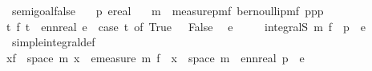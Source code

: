 \begin{isabellebody}
%
\isadelimproof
\isanewline
%
\endisadelimproof
\isanewline
\isanewline
{}\isamarkupfalse%
\ semi{\isacharunderscore}{\kern0pt}goal{}{}{\isacharunderscore}{\kern0pt}false{\isacharcolon}{\kern0pt}\isanewline
\ \ \ p{}\ e{\isacharcolon}{\kern0pt}{\isacharcolon}{\kern0pt}real\isanewline
\ \ \ {\isachardoublequoteopen}m\ {\isacharequal}{\kern0pt}\ measure{\isacharunderscore}{\kern0pt}pmf\ {\isacharparenleft}{\kern0pt}bernoulli{\isacharunderscore}{\kern0pt}pmf\ p{}{\isacharparenright}{\kern0pt}{\isachardoublequoteclose}{\isachardoublequoteopen}{}{\isasymle}p{}{\isachardoublequoteclose}{\isachardoublequoteopen}p{}{\isasymle}{}{\isachardoublequoteclose}\isanewline
{\isachardoublequoteopen}{\isasymAnd}t{\isachardot}{\kern0pt}\ f\ t\ {\isacharequal}{\kern0pt}\ ennreal\ e\ {\isacharasterisk}{\kern0pt}\ {\isacharparenleft}{\kern0pt}case\ t\ of\ True\ {\isasymRightarrow}\ {}{\isacharbar}{\kern0pt}\ False\ {\isasymRightarrow}\ {}{\isacharparenright}{\kern0pt}{\isachardoublequoteclose}\isanewline
{\isachardoublequoteopen}e\ {\isachargreater}{\kern0pt}\ {}{\isachardoublequoteclose}\isanewline
\ \ \ {\isachardoublequoteopen}integral\isactrlsup S\ m\ f\ {\isacharequal}{\kern0pt}\ {\isacharparenleft}{\kern0pt}{}{\isacharminus}{\kern0pt}p{}{\isacharparenright}{\kern0pt}\ {\isacharasterisk}{\kern0pt}\ e{\isachardoublequoteclose}\isanewline
%
\isadelimproof
\ \ %
\endisadelimproof
%
\isatagproof
{}\isamarkupfalse%
\ simple{\isacharunderscore}{\kern0pt}integral{\isacharunderscore}{\kern0pt}def\isanewline
{}\isamarkupfalse%
{\isacharminus}{\kern0pt}\isanewline
\ \ \isamarkupfalse%
{\isachardoublequoteopen}{\isacharparenleft}{\kern0pt}{\isasymSum}x{\isasymin}f\ {\isacharbackquote}{\kern0pt}\ space\ m{\isachardot}{\kern0pt}\ x\ {\isacharasterisk}{\kern0pt}\ emeasure\ m\ {\isacharparenleft}{\kern0pt}f\ {\isacharminus}{\kern0pt}{\isacharbackquote}{\kern0pt}\ {\isacharbraceleft}{\kern0pt}x{\isacharbraceright}{\kern0pt}\ {\isasyminter}\ space\ m{\isacharparenright}{\kern0pt}{\isacharparenright}{\kern0pt}\ {\isacharequal}{\kern0pt}\ ennreal\ {\isacharparenleft}{\kern0pt}{\isacharparenleft}{\kern0pt}{}{\isacharminus}{\kern0pt}p{}{\isacharparenright}{\kern0pt}\ {\isacharasterisk}{\kern0pt}\ e{\isacharparenright}{\kern0pt}{\isachardoublequoteclose}\isanewline
\ \ \isamarkupfalse%

\end{isabellebody}
